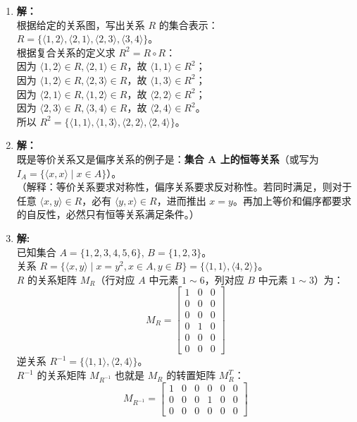 \begin{enumerate}
	\item \textbf{解：}\\
	根据给定的关系图，写出关系 $R$ 的集合表示：\\
	$R = \{\langle 1, 2 \rangle, \langle 2, 1 \rangle, \langle 2, 3 \rangle, \langle 3, 4 \rangle\}$。\\
	根据复合关系的定义求 $R^2 = R \circ R$：\\
	因为 $\langle 1, 2 \rangle \in R, \langle 2, 1 \rangle \in R$，故 $\langle 1, 1 \rangle \in R^2$；\\
	因为 $\langle 1, 2 \rangle \in R, \langle 2, 3 \rangle \in R$，故 $\langle 1, 3 \rangle \in R^2$；\\
	因为 $\langle 2, 1 \rangle \in R, \langle 1, 2 \rangle \in R$，故 $\langle 2, 2 \rangle \in R^2$；\\
	因为 $\langle 2, 3 \rangle \in R, \langle 3, 4 \rangle \in R$，故 $\langle 2, 4 \rangle \in R^2$。\\
	所以 $R^2 = \{\langle 1, 1 \rangle, \langle 1, 3 \rangle, \langle 2, 2 \rangle, \langle 2, 4 \rangle\}$。
	
	\vspace{1em}
	
	\item \textbf{解：}\\
	既是等价关系又是偏序关系的例子是：\textbf{集合 A 上的恒等关系}（或写为 $I_A = \{\langle x, x \rangle \mid x \in A\}$）。\\
	（解释：等价关系要求对称性，偏序关系要求反对称性。若同时满足，则对于任意 $\langle x, y \rangle \in R$，必有 $\langle y, x \rangle \in R$，进而推出 $x = y$。再加上等价和偏序都要求的自反性，必然只有恒等关系满足条件。）
	
	\vspace{1em}
	
	\item \textbf{解:}\\
	已知集合 $A = \{1, 2, 3, 4, 5, 6\}$, $B = \{1, 2, 3\}$。\\
	关系 $R = \{\langle x, y \rangle \mid x = y^2, x \in A, y \in B\} = \{\langle 1, 1 \rangle, \langle 4, 2 \rangle\}$。\\
	$R$ 的关系矩阵 $M_R$（行对应 $A$ 中元素 $1\sim 6$，列对应 $B$ 中元素 $1\sim 3$）为：
	$$
	M_R = \begin{bmatrix}
		1 & 0 & 0 \\
		0 & 0 & 0 \\
		0 & 0 & 0 \\
		0 & 1 & 0 \\
		0 & 0 & 0 \\
		0 & 0 & 0
	\end{bmatrix}
	$$
	逆关系 $R^{-1} = \{\langle 1, 1 \rangle, \langle 2, 4 \rangle\}$。\\
	$R^{-1}$ 的关系矩阵 $M_{R^{-1}}$ 也就是 $M_R$ 的转置矩阵 $M_R^T$：
	$$
	M_{R^{-1}} = \begin{bmatrix}
		1 & 0 & 0 & 0 & 0 & 0 \\
		0 & 0 & 0 & 1 & 0 & 0 \\
		0 & 0 & 0 & 0 & 0 & 0
	\end{bmatrix}
	$$
	

\end{enumerate}
